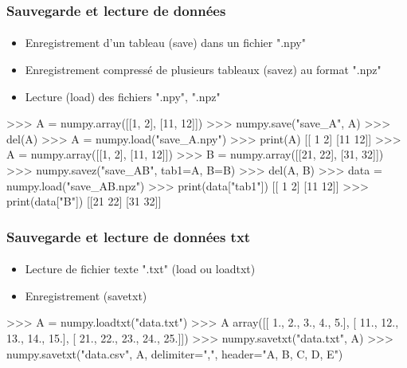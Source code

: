 \begin{frame}[fragile]
\frametitle{Sauvegarde et lecture de données}
\framesubtitle{}
\begin{itemize}
 \item Enregistrement d'un tableau (save) dans un fichier ".npy"
 \item Enregistrement compressé de plusieurs tableaux (savez) au format ".npz"
 \item Lecture (load) des fichiers ".npy", ".npz"
\end{itemize}
\begin{pythonConsole}
>>> A = numpy.array([[1, 2], [11, 12]])
>>> numpy.save("save_A", A)
>>> del(A)
>>> A = numpy.load("save_A.npy")
>>> print(A)
[[ 1  2]
 [11 12]]
>>> A = numpy.array([[1, 2], [11, 12]])
>>> B = numpy.array([[21, 22], [31, 32]])
>>> numpy.savez("save_AB", tab1=A, B=B)
>>> del(A, B)
>>> data = numpy.load("save_AB.npz")
>>> print(data["tab1"])
[[ 1  2]
 [11 12]]
>>> print(data["B"])
[[21 22]
 [31 32]]
\end{pythonConsole}
\end{frame}
\begin{frame}[fragile]
\frametitle{Sauvegarde et lecture de données txt}
\framesubtitle{}
\begin{itemize}
 \item Lecture de fichier texte ".txt" (load ou loadtxt) 
 \item Enregistrement (savetxt) 
\end{itemize}
\begin{pythonConsole}
>>> A = numpy.loadtxt("data.txt")
>>> A
array([[  1.,   2.,   3.,   4.,   5.],
       [ 11.,  12.,  13.,  14.,  15.],
       [ 21.,  22.,  23.,  24.,  25.]])
>>> numpy.savetxt("data.txt", A)
>>> numpy.savetxt("data.csv", A, delimiter=",", header="A, B, C, D, E")
\end{pythonConsole}
\end{frame}

